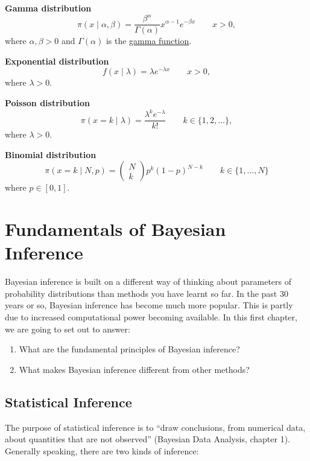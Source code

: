 \documentclass[
]{book}
\theoremstyle{definition}
\theoremstyle{definition}
\theoremstyle{definition}
\theoremstyle{definition}
\theoremstyle{remark}
\begin{document}
\textbf{Gamma distribution} \[
\pi(x\mid \alpha, \beta) = \frac{\beta^\alpha}{\Gamma(\alpha)}x^{\alpha - 1}e^{-\beta x} \qquad  x > 0,
\] where \(\alpha, \beta > 0\) and \(\Gamma(\alpha)\) is the \href{https://en.wikipedia.org/wiki/Gamma_function}{gamma
function}.

\textbf{Exponential distribution} \[
f(x \mid \lambda) = \lambda e^{-\lambda x} \qquad x > 0,
\] where \(\lambda > 0\).

\textbf{Poisson distribution} \[
\pi(x = k \mid \lambda) = \frac{\lambda^k e^{-\lambda}}{k!} \qquad k \in \{1, 2, \ldots\},
\] where \(\lambda > 0\).

\textbf{Binomial distribution} \[
\pi(x = k \mid N, p) = \begin{pmatrix} N \\ k\end{pmatrix} p^k (1-p)^{N-k} \qquad k \in \{1, \ldots, N\}
\] where \(p \in [0, 1]\).

\hypertarget{fundamentals}{%
\chapter{Fundamentals of Bayesian Inference}\label{fundamentals}}

Bayesian inference is built on a different way of thinking about parameters of probability distributions than methods you have learnt so far. In the past 30 years or so, Bayesian inference has become much more popular. This is partly due to increased computational power becoming available. In this first chapter, we are going to set out to answer:

\begin{enumerate}
\def\labelenumi{\arabic{enumi}.}
\item
  What are the fundamental principles of Bayesian inference?
\item
  What makes Bayesian inference different from other methods?
\end{enumerate}

\hypertarget{statistical-inference}{%
\section{Statistical Inference}\label{statistical-inference}}

The purpose of statistical inference is to ``draw conclusions, from numerical data, about quantities that are not observed'' (Bayesian Data Analysis, chapter 1). Generally speaking, there are two kinds of inference:
\end{document}
